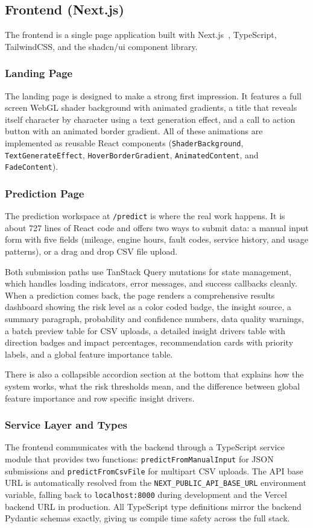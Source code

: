 \documentclass[conference]{IEEEtran}
\begin{document}
\subsection{Frontend (Next.js)}

The frontend is a single page application built with Next.js~\cite{nextjs}, TypeScript, TailwindCSS, and the shadcn/ui component library.

\subsubsection{Landing Page}
The landing page is designed to make a strong first impression. It features a full screen WebGL shader background with animated gradients, a title that reveals itself character by character using a text generation effect, and a call to action button with an animated border gradient. All of these animations are implemented as reusable React components (\texttt{ShaderBackground}, \texttt{TextGenerateEffect}, \texttt{HoverBorderGradient}, \texttt{AnimatedContent}, and \texttt{FadeContent}).

\subsubsection{Prediction Page}
The prediction workspace at \texttt{/predict} is where the real work happens. It is about 727 lines of React code and offers two ways to submit data: a manual input form with five fields (mileage, engine hours, fault codes, service history, and usage patterns), or a drag and drop CSV file upload.

Both submission paths use TanStack Query mutations for state management, which handles loading indicators, error messages, and success callbacks cleanly. When a prediction comes back, the page renders a comprehensive results dashboard showing the risk level as a color coded badge, the insight source, a summary paragraph, probability and confidence numbers, data quality warnings, a batch preview table for CSV uploads, a detailed insight drivers table with direction badges and impact percentages, recommendation cards with priority labels, and a global feature importance table.

There is also a collapsible accordion section at the bottom that explains how the system works, what the risk thresholds mean, and the difference between global feature importance and row specific insight drivers.

\subsubsection{Service Layer and Types}
The frontend communicates with the backend through a TypeScript service module that provides two functions: \texttt{predictFromManualInput} for JSON submissions and \texttt{predictFromCsvFile} for multipart CSV uploads. The API base URL is automatically resolved from the \texttt{NEXT\_PUBLIC\_API\_BASE\_URL} environment variable, falling back to \texttt{localhost:8000} during development and the Vercel backend URL in production. All TypeScript type definitions mirror the backend Pydantic schemas exactly, giving us compile time safety across the full stack.
\end{document}
